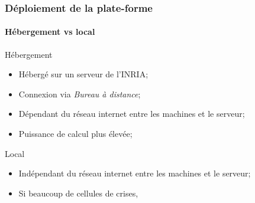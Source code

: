 \documentclass{beamer}
\begin{document}
		\begin{frame}
			\frametitle{Déploiement de la plate-forme}
			\framesubtitle{Hébergement vs local}
			\begin{block}{Hébergement}
				\begin{itemize}
					\item Hébergé sur un serveur de l'INRIA;
					\item Connexion via \textit{Bureau à distance};
					\item Dépendant du réseau internet entre les machines et le serveur;
					\item Puissance de calcul plus élevée;
				\end{itemize}
			\end{block}
			\begin{block}{Local}
				\begin{itemize}
					\item Indépendant du réseau internet entre les machines et le serveur;
					\item Si beaucoup de cellules de crises,
				\end{itemize}
			\end{block}
		\end{frame}
\end{document}
